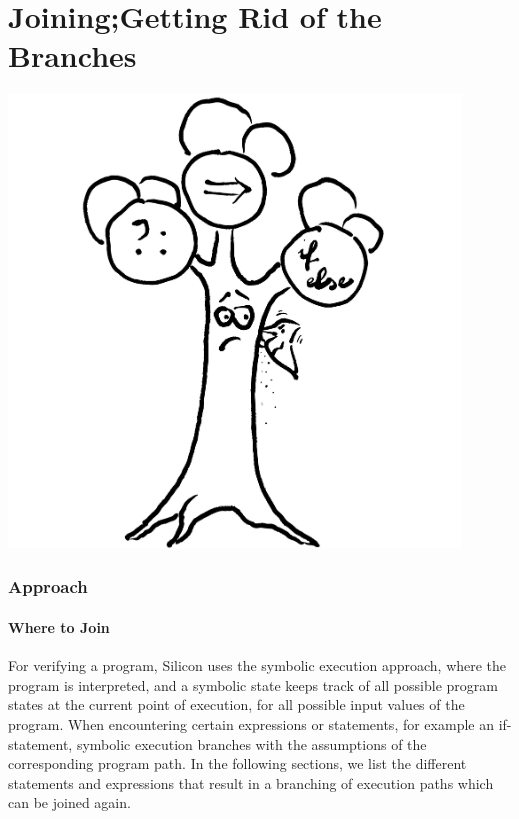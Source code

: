 \documentclass[11pt]{article}
\begin{document}
    \part{Joining;\newline Getting Rid of the Branches} \label{part-2}
    \begin{center}
        \vspace{2cm}
        \includegraphics[width=0.9\textwidth]{tree}
    \end{center}

    \newpage
    \section{Approach} \label{p2-approach}

    \subsection{Where to Join}

    For verifying a program, Silicon uses the symbolic execution approach, where the program is interpreted,
    and a symbolic state keeps track of all possible program states at the current point of execution, for all
    possible input values of the program. When encountering certain expressions or statements, for example an
    if-statement, symbolic execution branches with the assumptions of the corresponding program path.
    In the following sections, we list the different statements and expressions 
    that result in a branching of execution paths which can be joined again.
\end{document}
